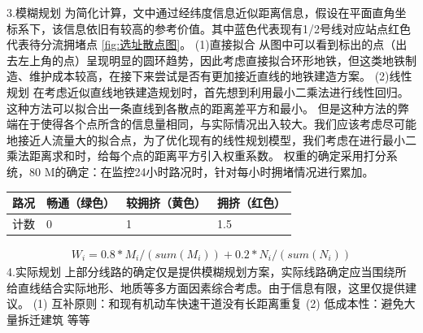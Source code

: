\documentclass[12pt,a4paper]{mcmthesis}
\begin{document}
    3.模糊规划
    为简化计算，文中通过经纬度信息近似距离信息，假设在平面直角坐标系下，该信息依旧有较高的参考价值。其中蓝色代表现有1/2号线对应站点红色代表待分流拥堵点 \ref{fig:选址散点图}。
    (1)直接拟合
    从图中可以看到标出的点（出去左上角的点）呈现明显的圆环趋势，因此考虑直接拟合环形地铁，但这类地铁制造、维护成本较高，在接下来尝试是否有更加接近直线的地铁建造方案。
    (2)线性规划
    在考虑近似直线地铁建造规划时，首先想到利用最小二乘法进行线性回归。这种方法可以拟合出一条直线到各散点的距离差平方和最小。
    但是这种方法的弊端在于使得各个点所含的信息量相同，与实际情况出入较大。我们应该考虑尽可能地接近人流量大的拟合点，为了优化现有的线性规划模型，我们考虑在进行最小二乘法距离求和时，给每个点的距离平方引入权重系数。
    权重的确定采用打分系统，80%
    M的确定：在监控24小时路况时，针对每小时拥堵情况进行累加。
    \begin{table}
        \centering
        \begin{tabular}{|l|l|l|l|}
            \hline
            路况 & 畅通（绿色） & 较拥挤（黄色） & 拥挤（红色） \\ \hline
            计数 & 0      & 1       & 1.5    \\ \hline
        \end{tabular}
    \end{table}
    \begin{equation}
        \begin{aligned}
            W_i=0.8*M_i/(sum(M_i))+0.2*N_i/(sum(N_i))
        \end{aligned}
    \end{equation}
    4.实际规划
    上部分线路的确定仅是提供模糊规划方案，实际线路确定应当围绕所给直线结合实际地形、地质等多方面因素综合考虑。由于信息有限，这里仅提供建议。
    (1)    互补原则：和现有机动车快速干道没有长距离重复
    (2)    低成本性：避免大量拆迁建筑
    等等
\end{document}
